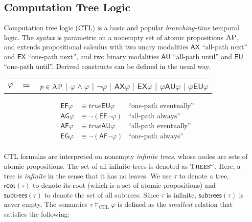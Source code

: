 \documentclass[acmsmall]{acmart}
\newcommand{\AP}{\textsc{AP}}
\newcommand{\true}{\mathit{true}}
\newcommand{\AG}{{\mathsf{AG}}}
\newcommand{\EG}{{\mathsf{EG}}}
\newcommand{\AF}{{\mathsf{AF}}}
\newcommand{\EF}{{\mathsf{EF}}}
\newcommand{\AX}{\mathsf{AX}}
\newcommand{\AU}{\mathbin{\mathsf{AU}}}
\newcommand{\EU}{\mathbin{\mathsf{EU}}}
\newcommand{\EX}{\mathsf{EX}}
\newcommand{\rt}{\mathsf{root}}
\newcommand{\subtrees}{\mathsf{subtrees}}
\newcommand{\fullpaths}{\mathsf{fullpaths}}
\newcommand{\infTrees}{\textsc{Trees$^\omega$}\xspace}
\newcommand{\CTL}{\mathrm{CTL}}
\begin{document}
\subsection{Computation Tree Logic}
Computation tree logic (CTL) is a basic and popular
\emph{branching-time} temporal logic.
The \emph{syntax}
is parametric on a nonempty set of 
atomic propositions $\AP$, and extends propositional calculus with
two unary modalities $\AX$ ``all-path next''
and $\EX$ ``one-path next'', 
and two binary modalities
$\AU$ ``all-path until''
and $\EU$ ``one-path until''.
Derived constructs can be defined in the usual way.
\begin{center}
\begin{tabular}{crl}
$\varphi$ & $\Coloneqq$ & $p \in \AP$
          $|$ $\varphi \wedge \varphi$
          $|$ $\neg \varphi$
          $|$ $\AX \varphi$
          $|$ $\EX \varphi$
          $|$ $\varphi \AU \varphi$
          $|$ $\varphi \EU \varphi$
\end{tabular}
\begin{align*}
\EF \varphi &\equiv \true \EU \varphi
& \text{``one-path eventually''}
\\
\AG \varphi &\equiv \neg (\EF \neg \varphi)
& \text{``all-path always''}
\\
\AF \varphi &\equiv \true \AU \varphi 
& \text{``all-path eventually''}
\\
\EG \varphi &\equiv \neg (\AF \neg \varphi)
& \text{``one-path always''}
\\
\end{align*}
\end{center}
CTL formulas are interpreted on nonempty \emph{infinite trees},
whose nodes are sets of atomic propositions.
The set of all infinite trees is denoted as $\infTrees$.
Here, a tree is \emph{infinite} in the sense that
it has no leaves.
We use $\tau$ to denote a tree, 
$\rt(\tau)$ to denote its root 
(which is a set of atomic propositions)
and $\subtrees(\tau)$ to denote the set of all subtrees.
Since $\tau$ is infinite, $\subtrees(\tau)$ is never empty.
The semantics $\tau \vDash_\CTL \varphi$ is defined as the
\emph{smallest} relation that satisfies the following:
\end{document}
